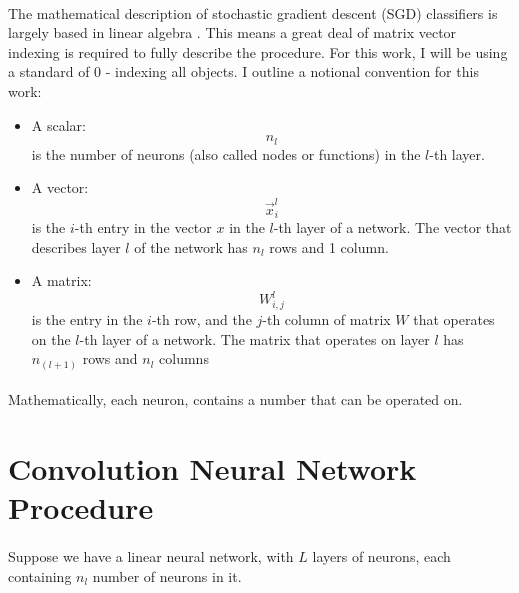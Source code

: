 \documentclass[12pt,letterpaper]{article}
\begin{document}
\paragraph*{}The mathematical description of stochastic gradient descent (SGD) classifiers is largely based in linear algebra \cite{Goodfellow}. This means a great deal of matrix vector indexing is required to fully describe the procedure. For this work, I will be using a standard of $0$ - indexing all objects. I outline a notional convention for this work:
\begin{itemize}
\item A scalar:
\begin{equation}
n_l
\end{equation} 
is the number of neurons (also called nodes or functions) in the 
$l$-th layer. 
\item A vector:
\begin{equation}
\vec{x}_{i}^{l}
\end{equation}
is the $i$-th entry in the vector $x$ in the $l$-th layer of a network. The vector that describes layer $l$ of the network has $n_l$ rows and 1 column.
\item A matrix:
\begin{equation}
W_{i,j}^{l}
\end{equation}
is the entry in the $i$-th row, and the $j$-th column of matrix $W$ that operates on the $l$-th layer of a network. The matrix that operates on layer $l$ has $n_{(l+1)}$ rows and $n_{l}$ columns
\end{itemize}
\paragraph*{}Mathematically, each neuron, contains a number that can be operated on. 


\section{Convolution Neural Network Procedure}
\paragraph*{}Suppose we have a linear neural network, with $L$ layers of neurons, each containing $n_l$ number of neurons in it. 


\end{document}
